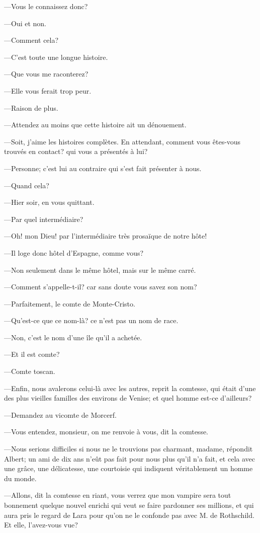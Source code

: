 —Vous le connaissez donc? 

—Oui et non. 

—Comment cela? 

—C'est toute une longue histoire. 

—Que vous me raconterez? 

—Elle vous ferait trop peur. 

—Raison de plus.  

—Attendez au moins que cette histoire ait un dénouement. 

—Soit, j'aime les histoires complètes. En attendant, comment vous êtes-vous trouvés en contact? qui vous a présentés à lui? 

—Personne; c'est lui au contraire qui s'est fait présenter à nous. 

—Quand cela? 

—Hier soir, en vous quittant. 

—Par quel intermédiaire? 

—Oh! mon Dieu! par l'intermédiaire très prosaïque de notre hôte! 

—Il loge donc hôtel d'Espagne, comme vous? 

—Non seulement dans le même hôtel, mais sur le même carré. 

—Comment s'appelle-t-il? car sans doute vous savez son nom? 

—Parfaitement, le comte de Monte-Cristo. 

—Qu'est-ce que ce nom-là? ce n'est pas un nom de race. 

—Non, c'est le nom d'une île qu'il a achetée. 

—Et il est comte? 

—Comte toscan. 

—Enfin, nous avalerons celui-là avec les autres, reprit la comtesse, qui était d'une des plus vieilles familles des environs de Venise; et quel homme est-ce d'ailleurs? 

—Demandez au vicomte de Morcerf. 

—Vous entendez, monsieur, on me renvoie à vous, dit la comtesse. 

—Nous serions difficiles si nous ne le trouvions pas charmant, madame, répondit Albert; un ami de dix ans n'eût pas fait pour nous plus qu'il n'a fait, et cela avec une grâce, une délicatesse, une courtoisie qui indiquent véritablement un homme du monde. 

—Allons, dit la comtesse en riant, vous verrez que mon vampire sera tout bonnement quelque nouvel enrichi qui veut se faire pardonner ses millions, et qui aura pris le regard de Lara pour qu'on ne le confonde pas avec M. de Rothschild. Et elle, l'avez-vous vue? 

